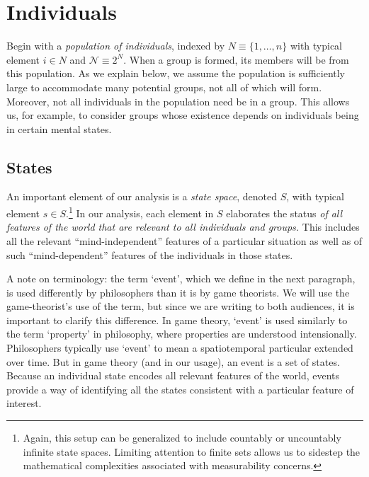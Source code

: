 \documentclass[
11pt,
titlepage,
reqno,
]{article}%
\theoremstyle{definition}
\begin{document}
	
	\section{Individuals}\label{sec: Individuals}
	
	Begin with a \textit{population of individuals}, indexed by $N\equiv \{1,\ldots,n\}$ with typical element $i\in N$ and $\mathcal{N}\equiv 2^N$. 
	When a group is formed, its members will be from this population. 
	As we explain below, we assume the population is sufficiently large to accommodate many potential groups, not all of which will form. Moreover, not all individuals in the population need be in a group. 
	This allows us, for example, to consider groups whose existence depends on individuals being in certain mental states. 
	
	
	
	\subsection{States\label{sec:states}}
	An important element of our analysis is a \textit{state space}, denoted $S$, with typical element $s\in S$.\footnote
	{
		Again, this setup can be generalized to include countably or uncountably infinite state spaces. Limiting attention to finite sets allows us to sidestep the mathematical complexities associated with measurability concerns.
	} 
	In our analysis,  each element in $S$ elaborates the status \textit{of all features of the world that are relevant to all individuals and groups.} 
	This includes all the relevant ``mind-independent'' features of a particular situation as well as of such ``mind-dependent'' features of the individuals in those states. 
	
	A note on terminology: the term `event', which we define in the next paragraph, is used differently by philosophers than it is by game theorists. 
	We will use the game-theorist's use of the term, but since we are writing to both audiences, it is important to clarify this difference. 
	In game theory, `event' is used similarly to the term `property' in philosophy, where properties are understood intensionally. 
	Philosophers typically use `event' to mean a spatiotemporal particular extended over time. 
	But in game theory (and in our usage), an event is a set of states. 
	Because an individual state encodes all relevant features of the world, events provide a way of identifying all the states consistent with a particular feature of interest.
	
\end{document}

